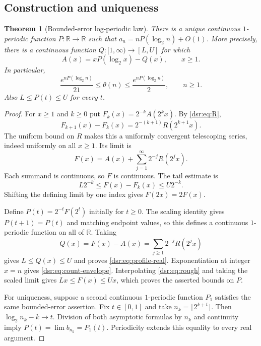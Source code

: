 \documentclass[11pt,a4paper]{article}
\numberwithin{equation}{section}
\newtheorem{theorem}{Theorem}[section]
\theoremstyle{definition}
\theoremstyle{remark}
\newcommand{\R}{\mathbb R}
\theoremstyle{definition}
\theoremstyle{plain}
\begin{document}
\subsection{Construction and uniqueness}
\begin{theorem}[Bounded-error log-periodic law]
\label{dsr:thm:profile}
There is a unique continuous $1$-periodic function $P:\R\to\R$ such that
$a_n=nP(\log_2n)+O(1)$. More precisely, there is a continuous function
$Q:[1,\infty)\to[L,U]$ for which
\begin{equation}
 A(x)=xP(\log_2x)-Q(x),\qquad x\ge1.
\label{dsr:eq:profile-real}
\end{equation}
In particular,
\begin{equation}
 \frac{e^{nP(\log_2n)}}{21}\le\theta(n)
 \le\frac{e^{nP(\log_2n)}}{2},\qquad n\ge1.
\label{dsr:eq:count-envelope}
\end{equation}
Also $L\le P(t)\le U$ for every $t$.
\end{theorem}
\begin{proof}
For $x\ge1$ and $k\ge0$ put $F_k(x)=2^{-k}A(2^kx)$. By
\eqref{dsr:eq:R},
\begin{equation}
 F_{k+1}(x)-F_k(x)=2^{-(k+1)}R(2^{k+1}x).
\end{equation}
The uniform bound on $R$ makes this a uniformly convergent telescoping series,
indeed uniformly on all $x\ge1$. Its limit is
\begin{equation}
 F(x)=A(x)+\sum_{j=1}^{\infty}2^{-j}R(2^jx).
\label{dsr:eq:F}
\end{equation}
Each summand is continuous, so $F$ is continuous. The tail estimate is
\begin{equation}
 L2^{-k}\le F(x)-F_k(x)\le U2^{-k}.
\label{dsr:eq:uniform-tail}
\end{equation}
Shifting the defining limit by one index gives $F(2x)=2F(x)$.

Define $P(t)=2^{-t}F(2^t)$ initially for $t\ge0$. The scaling identity gives
$P(t+1)=P(t)$ and matching endpoint values, so this defines a continuous
$1$-periodic function on all of $\R$. Taking
\begin{equation}
 Q(x)=F(x)-A(x)=\sum_{j\ge1}2^{-j}R(2^jx)
\label{dsr:eq:Q}
\end{equation}
gives $L\le Q(x)\le U$ and proves \eqref{dsr:eq:profile-real}. Exponentiation at
integer $x=n$ gives \eqref{dsr:eq:count-envelope}. Interpolating
\eqref{dsr:eq:rough} and taking the scaled limit gives $Lx\le F(x)\le Ux$,
which proves the asserted bounds on $P$.

For uniqueness, suppose a second continuous $1$-periodic function $P_1$
satisfies the same bounded-error assertion. Fix $t\in[0,1]$ and take
$n_k=\lfloor2^{k+t}\rfloor$. Then $\log_2n_k-k\to t$. Division of both
asymptotic formulas by $n_k$ and continuity imply
$P(t)=\lim b_{n_k}=P_1(t)$. Periodicity extends this equality to every real
argument.
\end{proof}
\end{document}
